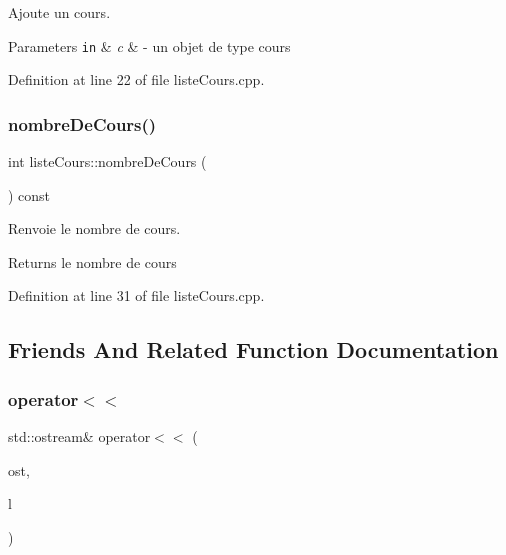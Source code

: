Ajoute un cours. 


\begin{DoxyParams}[1]{Parameters}
\mbox{\tt in}  & {\em c} & -\/ un objet de type cours \\
\hline
\end{DoxyParams}


Definition at line 22 of file liste\+Cours.\+cpp.

\hypertarget{classliste_cours_a34b859c2380770eb560c0a6dcf01cc81}{}\label{classliste_cours_a34b859c2380770eb560c0a6dcf01cc81} 
\subsubsection{\texorpdfstring{nombre\+De\+Cours()}{nombreDeCours()}}
{\footnotesize\ttfamily int liste\+Cours\+::nombre\+De\+Cours (\begin{DoxyParamCaption}{ }\end{DoxyParamCaption}) const}



Renvoie le nombre de cours. 

\begin{DoxyReturn}{Returns}
le nombre de cours 
\end{DoxyReturn}


Definition at line 31 of file liste\+Cours.\+cpp.



\subsection{Friends And Related Function Documentation}
\hypertarget{classliste_cours_a78ee4cc125386ff5f709ea4ec9438f69}{}\label{classliste_cours_a78ee4cc125386ff5f709ea4ec9438f69} 
\subsubsection{\texorpdfstring{operator$<$$<$}{operator<<}}
{\footnotesize\ttfamily std\+::ostream\& operator$<$$<$ (\begin{DoxyParamCaption}\item[{std\+::ostream \&}]{ost,  }\item[{const \hyperlink{classliste_cours}{liste\+Cours} \&}]{l }\end{DoxyParamCaption})\hspace{0.3cm}{\ttfamily [friend]}}




